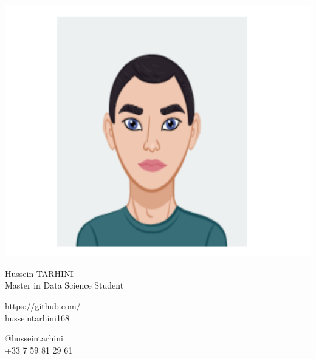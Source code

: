 \documentclass{article}
\begin{document}
\centering \includegraphics[width=.25\linewidth]{logo.pdf}\\[5pt]
\parbox{2in}{\Large \centering Hussein TARHINI\\[1pt]
\normalsize Master in Data Science Student}

\vfill
\raggedright
\begin{multicols}{2}
https://github.com/\\
husseintarhini168

\columnbreak
\raggedleft
@husseintarhini\\
+33 7 59 81 29 61%
\end{multicols}%
\end{document}
